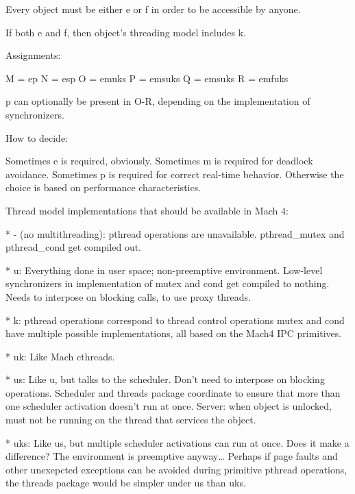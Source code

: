 {                Every object must be either e or f
                in order to be accessible by anyone.

                If both e and f, then object's threading model includes k.

        Assignments:

                M = ep
                N = esp
                O = em{uks}
                P = ems{uks}
                Q = ems{uks}
                R = emf{uks}

                p can optionally be present in O-R,
                depending on the implementation of synchronizers.

        How to decide:

                Sometimes e is required, obviously.
                Sometimes m is required for deadlock avoidance.
                Sometimes p is required for correct real-time behavior.
                Otherwise the choice is based on performance characteristics.


Thread model implementations that should be available in Mach 4:

* - (no multithreading):
        pthread operations are unavailable.
        pthread_mutex and pthread_cond get compiled out.

* u:
        Everything done in user space; non-preemptive environment.
        Low-level synchronizers in implementation of mutex and cond
        get compiled to nothing.
        Needs to interpose on blocking calls, to use proxy threads.

* k:
        pthread operations correspond to thread control operations
        mutex and cond have multiple possible implementations,
        all based on the Mach4 IPC primitives.

* uk:
        Like Mach cthreads.

* us:
        Like u, but talks to the scheduler.
        Don't need to interpose on blocking operations.
        Scheduler and threads package coordinate
        to ensure that more than one scheduler activation doesn't run at once.
        Server: when object is unlocked, must not be running
                on the thread that services the object.

* uks:
        Like us, but multiple scheduler activations can run at once.
        Does it make a difference?
        The environment is preemptive anyway\ldots{}
        Perhaps if page faults and other unexepcted exceptions
        can be avoided during primitive pthread operations,
        the threads package would be simpler under us than uks.


}
